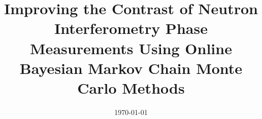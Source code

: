 \documentclass[a4paper, 11pt, oneside]{Thesis}  %
\begin{document}
\frontmatter	  %

\title  {Improving the Contrast of Neutron Interferometry Phase Measurements Using Online Bayesian Markov Chain Monte Carlo Methods}
\addresses  {\groupname\\\deptname\\\univname}  %
\date       {\today}
\subject    {}
\keywords   {}

\maketitle


\fancyhead{}  %
\rhead{\thepage}  %
\lhead{}  %

\pagestyle{fancy}  %
\end{document}
